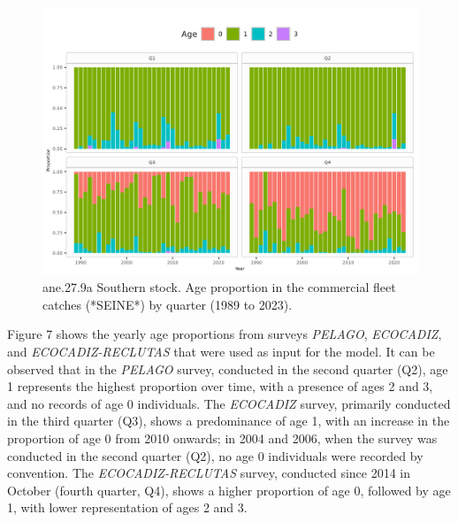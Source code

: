 \documentclass[
]{article}
\begin{document}
\begin{figure}[H]

{\centering \includegraphics[width=0.95\linewidth]{report/run/S1.0_4FLEETS_SelECO_RecIndex_Mnewfix/fig_agecomp_by_quartersSeine} 

}

\caption{ane.27.9a Southern stock. Age proportion in the commercial fleet catches (*SEINE*) by quarter (1989 to 2023).}\label{fig:unnamed-chunk-33}
\end{figure}

Figure 7 shows the yearly age proportions from surveys \emph{PELAGO},
\emph{ECOCADIZ}, and \emph{ECOCADIZ-RECLUTAS} that were used as input
for the model. It can be observed that in the \emph{PELAGO} survey,
conducted in the second quarter (Q2), age 1 represents the highest
proportion over time, with a presence of ages 2 and 3, and no records of
age 0 individuals. The \emph{ECOCADIZ} survey, primarily conducted in
the third quarter (Q3), shows a predominance of age 1, with an increase
in the proportion of age 0 from 2010 onwards; in 2004 and 2006, when the
survey was conducted in the second quarter (Q2), no age 0 individuals
were recorded by convention. The \emph{ECOCADIZ-RECLUTAS} survey,
conducted since 2014 in October (fourth quarter, Q4), shows a higher
proportion of age 0, followed by age 1, with lower representation of
ages 2 and 3.
\end{document}
